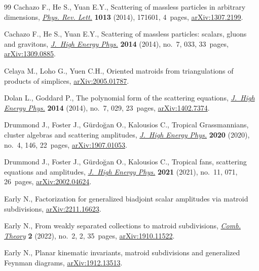 \documentclass[pdftex]{sigma}
\theoremstyle{definition}
\numberwithin{equation}{section}
\begin{document}
\begin{thebibliography}{99}
Cachazo F., He S., Yuan E.Y., Scattering of massless particles in arbitrary
 dimensions, \href{https://doi.org/10.1103/PhysRevLett.113.171601}{\textit{Phys. Rev. Lett.}} \textbf{1013} (2014), 171601, 4~pages,
 \href{https://arxiv.org/abs/1307.2199}{arXiv:1307.2199}.

Cachazo F., He S., Yuan E.Y., Scattering of massless particles: scalars, gluons
 and gravitons, \href{https://doi.org/10.1007/JHEP07(2014)033}{\textit{J.~High Energy Phys.}} \textbf{2014} (2014), no.~7,
 033, 33~pages, \href{https://arxiv.org/abs/1309.0885}{arXiv:1309.0885}.

Celaya M., Loho G., Yuen C.H., Oriented matroids from triangulations of
 products of simplices, \href{https://arxiv.org/abs/2005.01787}{arXiv:2005.01787}.

Dolan L., Goddard P., The polynomial form of the scattering equations,
 \href{https://doi.org/10.1007/JHEP07(2014)029}{\textit{J.~High Energy Phys.}} \textbf{2014} (2014), no.~7, 029, 23~pages,
 \href{https://arxiv.org/abs/1402.7374}{arXiv:1402.7374}.

Drummond J., Foster J., G\"urdo\u{g}an O., Kalousios C., Tropical
 {G}rassmannians, cluster algebras and scattering amplitudes, \href{https://doi.org/10.1007/jhep04(2020)146}{\textit{J.~High
 Energy Phys.}} \textbf{2020} (2020), no.~4, 146, 22~pages,
 \href{https://arxiv.org/abs/1907.01053}{arXiv:1907.01053}.

Drummond J., Foster J., G\"urdo\u{g}an O., Kalousios C., Tropical fans,
 scattering equations and amplitudes, \href{https://doi.org/10.1007/jhep11(2021)071}{\textit{J.~High Energy Phys.}}
 \textbf{2021} (2021), no.~11, 071, 26~pages, \href{https://arxiv.org/abs/2002.04624}{arXiv:2002.04624}.

Early N., Factorization for generalized biadjoint scalar amplitudes via matroid
 subdivisions, \href{https://arxiv.org/abs/2211.16623}{arXiv:2211.16623}.

Early N., From weakly separated collections to matroid subdivisions,
 \href{https://doi.org/10.5070/C62257873}{\textit{Comb. Theory}} \textbf{2} (2022), no.~2, 2, 35~pages,
 \href{https://arxiv.org/abs/1910.11522}{arXiv:1910.11522}.


Early N., Planar kinematic invariants, matroid subdivisions and generalized
 {F}eynman diagrams, \href{https://arxiv.org/abs/1912.13513}{arXiv:1912.13513}.


\end{thebibliography}
\end{document}
